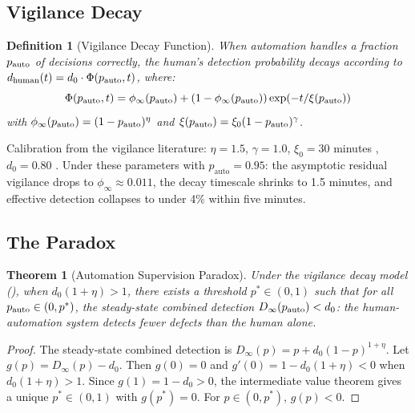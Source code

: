 \documentclass[11pt, a4paper, copyright]{googledeepmind}
\newtheorem{definition}{Definition}[section]
\newtheorem{theorem}{Theorem}[section]
\begin{document}
\subsection{Vigilance Decay}

\begin{definition}[Vigilance Decay Function]
\label{def:vigilance}
When automation handles a fraction $p_{\textup{auto}}$ of decisions correctly, the human's detection probability decays according to $d_{\textup{human}}(t) = d_0 \cdot \Phi(p_{\textup{auto}}, t)$, where:
\begin{equation}
\Phi(p_{\textup{auto}}, t) = \phi_\infty(p_{\textup{auto}}) + (1 - \phi_\infty(p_{\textup{auto}})) \exp\!\left(-t / \xi(p_{\textup{auto}})\right)
\end{equation}
with $\phi_\infty(p_{\textup{auto}}) = (1 - p_{\textup{auto}})^\eta$ and $\xi(p_{\textup{auto}}) = \xi_0 (1 - p_{\textup{auto}})^\gamma$.
\end{definition}

Calibration from the vigilance literature: $\eta = 1.5$, $\gamma = 1.0$, $\xi_0 = 30$ minutes \citep{mackworth1948breakdown, see1995meta}, $d_0 = 0.80$ \citep{cohen2006best}. Under these parameters with $p_{\text{auto}} = 0.95$: the asymptotic residual vigilance drops to $\phi_\infty \approx 0.011$, the decay timescale shrinks to 1.5 minutes, and effective detection collapses to under 4\% within five minutes.

\subsection{The Paradox}

\begin{theorem}[Automation Supervision Paradox]
\label{thm:paradox}
Under the vigilance decay model (), when $d_0(1+\eta) > 1$, there exists a threshold $p^* \in (0,1)$ such that for all $p_{\textup{auto}} \in (0, p^*)$, the steady-state combined detection $D_\infty(p_{\textup{auto}}) < d_0$: the human-automation system detects fewer defects than the human alone.
\end{theorem}

\begin{proof}
The steady-state combined detection is $D_\infty(p) = p + d_0(1-p)^{1+\eta}$. Let $g(p) = D_\infty(p) - d_0$. Then $g(0) = 0$ and $g'(0) = 1 - d_0(1+\eta) < 0$ when $d_0(1+\eta) > 1$. Since $g(1) = 1 - d_0 > 0$, the intermediate value theorem gives a unique $p^* \in (0,1)$ with $g(p^*) = 0$. For $p \in (0, p^*)$, $g(p) < 0$.
\end{proof}
\end{document}
